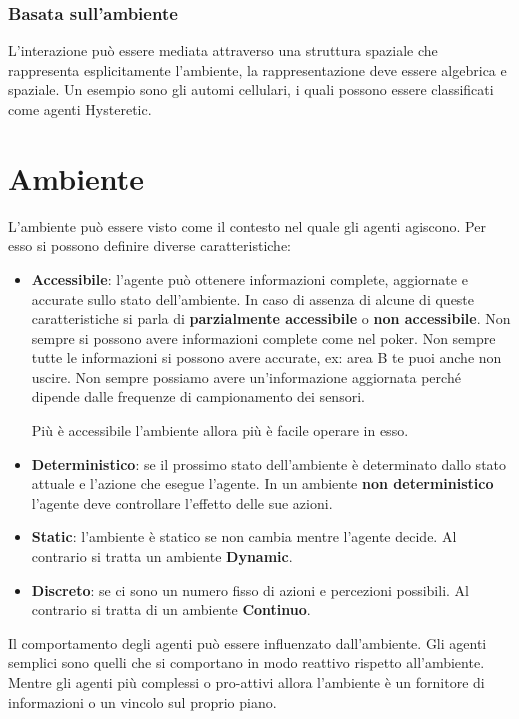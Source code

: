 \subsubsection{Basata sull'ambiente}
L'interazione può essere mediata attraverso una struttura spaziale che
rappresenta esplicitamente l'ambiente, la rappresentazione deve essere algebrica
e spaziale. Un esempio sono gli automi cellulari, i quali possono essere
classificati come agenti Hysteretic.
\section{Ambiente}
L'ambiente può essere visto come il contesto nel quale gli agenti agiscono. Per
esso si possono definire diverse caratteristiche:
\begin{itemize}
    \item \textbf{Accessibile}: l'agente può ottenere informazioni complete,
          aggiornate e accurate sullo stato dell'ambiente. In caso di assenza di
          alcune di queste caratteristiche si parla di \textbf{parzialmente
              accessibile} o \textbf{non accessibile}.
          Non sempre si possono avere informazioni complete come nel poker.
          Non sempre tutte le informazioni si possono avere accurate, ex: area
          B te puoi anche non uscire. Non sempre possiamo avere un'informazione
          aggiornata perché dipende dalle frequenze di campionamento dei sensori.

          Più è accessibile l'ambiente allora più è facile operare in esso.
    \item \textbf{Deterministico}: se il prossimo stato dell'ambiente è determinato
    dallo stato attuale e l'azione che esegue l'agente. In un ambiente \textbf{non deterministico}
          l'agente deve controllare l'effetto delle sue azioni.
    \item \textbf{Static}: l'ambiente è statico se non cambia mentre
          l'agente decide. Al contrario si tratta un ambiente \textbf{Dynamic}.
    \item \textbf{Discreto}: se ci sono un numero fisso di azioni e percezioni
          possibili. Al contrario si tratta di un ambiente \textbf{Continuo}.
\end{itemize}

Il comportamento degli agenti può essere influenzato dall'ambiente. Gli agenti
semplici sono quelli che si comportano in modo reattivo rispetto all'ambiente.
Mentre gli agenti più complessi o pro-attivi allora l'ambiente è un fornitore di
informazioni o un vincolo sul proprio piano.

